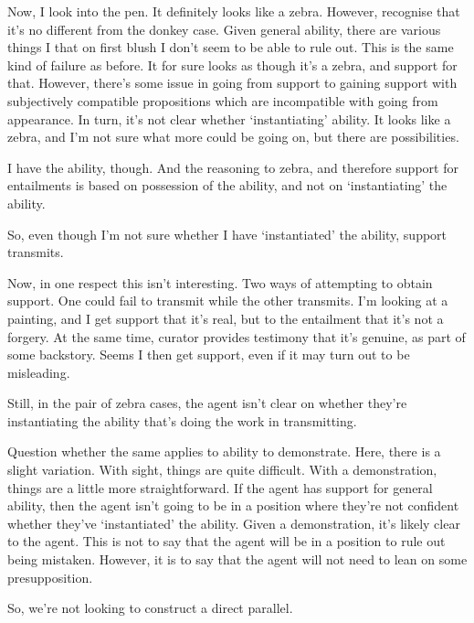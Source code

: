 \documentclass[10pt]{article}
\begin{document}
\begin{note}
  Now, I look into the pen.
  It definitely looks like a zebra.
  However, recognise that it's no different from the donkey case.
  Given general ability, there are various things I that on first blush I don't seem to be able to rule out.
  This is the same kind of failure as before.
  It for sure looks as though it's a zebra, and support for that.
  However, there's some issue in going from support to gaining support with subjectively compatible propositions which are incompatible with going from appearance.
  In turn, it's not clear whether `instantiating' ability.
  It looks like a zebra, and I'm not sure what more could be going on, but there are possibilities.

  I have the ability, though.
  And the reasoning to zebra, and therefore support for entailments is based on possession of the ability, and not on `instantiating' the ability.

  So, even though I'm not sure whether I have `instantiated' the ability, support transmits.

  Now, in one respect this isn't interesting.
  Two ways of attempting to obtain support.
  One could fail to transmit while the other transmits.
  I'm looking at a painting, and I get support that it's real, but to the entailment that it's not a forgery.
  At the same time, curator provides testimony that it's genuine, as part of some backstory.
  Seems I then get support, even if it may turn out to be misleading.

  Still, in the pair of zebra cases, the agent isn't clear on whether they're instantiating the ability that's doing the work in transmitting.
\end{note}

\begin{note}
  Question whether the same applies to ability to demonstrate.
  Here, there is a slight variation.
  With sight, things are quite difficult.
  With a demonstration, things are a little more straightforward.
  If the agent has support for general ability, then the agent isn't going to be in a position where they're not confident whether they've `instantiated' the ability.
  Given a demonstration, it's likely clear to the agent.
  This is not to say that the agent will be in a position to rule out being mistaken.
  However, it is to say that the agent will not need to lean on some presupposition.

  So, we're not looking to construct a direct parallel.
\end{note}
\end{document}
